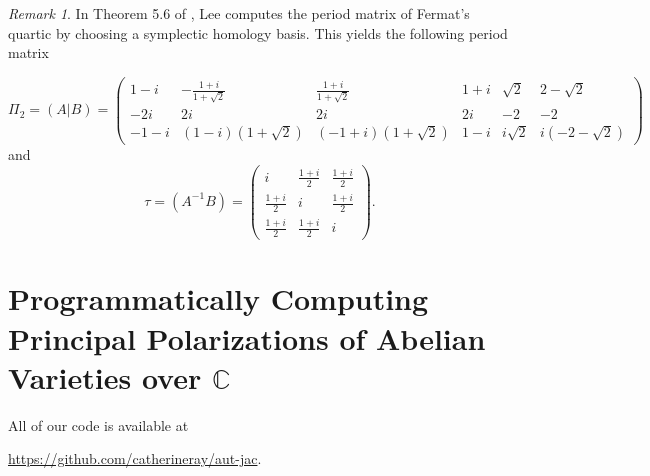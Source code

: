 \documentclass[12pt,reqno]{amsart}
\theoremstyle{definition}
\theoremstyle{remark}
\newtheorem*{remark}{Remark}
\begin{document}

 
\begin{remark} In Theorem 5.6 of \cite{dthesis}, Lee computes the period matrix of Fermat's quartic by choosing a symplectic homology basis. This yields the following period matrix

$$\Pi_2 = (A|B) = \begin{pmatrix}  1 - i& -\frac{1 + i}{1 + \sqrt{2}}& \frac{1 + i}{1 + \sqrt{2}}& 1 + i& \sqrt{2}& 2 - \sqrt{2} \\  -2i& 2i& 2i& 2i& -2& -2\\ -1 - i & (1 - i)(1 + \sqrt{2})& (-1 + i)(1 + \sqrt{2})& 1 - i& i\sqrt{2}& i(-2 - \sqrt{2})  \end{pmatrix} $$ and $$\tau = (A^{-1}B) = \begin{pmatrix}i & \frac{1 + i}{2} & \frac{1 + i}{2}\\
\frac{1 + i}{2} & i & \frac{1 + i}{2}\\
\frac{1 + i}{2} & \frac{1 + i}{2} & i\end{pmatrix}.$$\end{remark}






 \section{Programmatically Computing Principal Polarizations of Abelian Varieties over $\mathbb{C}$}

\label{sec:computing}

\noindent All of our code is available at \begin{center}\url{https://github.com/catherineray/aut-jac}.\end{center} 
\end{document}
